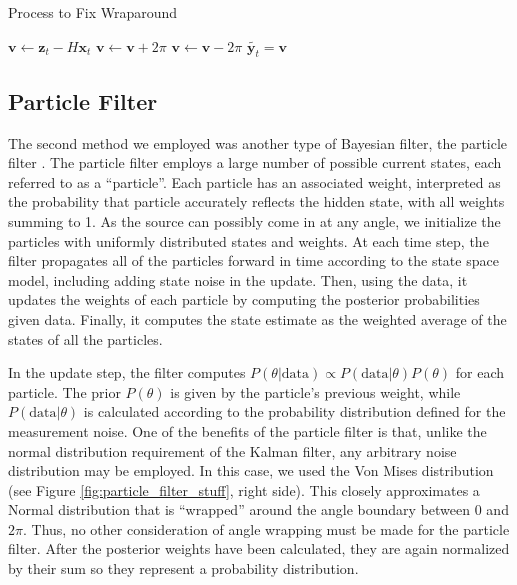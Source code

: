 \documentclass[11pt]{amsart}
\begin{document}
\begin{algorithm}
    \caption{Process to Fix Wraparound}\label{alg:kalman}    
    \begin{algorithmic}
        \State $\mathbf{v} \gets \mathbf{z}_t - H\mathbf{x}_t$
            \State $\mathbf{v} \gets \mathbf{v} + 2\pi$
            \State $\mathbf{v} \gets \mathbf{v} - 2\pi$
        \EndIf 
        \State $\tilde{\mathbf{y}_t} = \mathbf{v}$ 
        \end{algorithmic}
    \end{algorithm}


\subsection{Particle Filter}
The second method we employed was another type of Bayesian filter, the particle filter \cite{Particle}. The particle filter employs a large number of possible current states, each referred to 
as a “particle”. Each particle has an associated weight, interpreted as the probability that particle accurately reflects the hidden state, with all weights summing to 1. As the source can possibly 
come in at any angle, we initialize the particles with uniformly distributed states and weights. At each time step, the filter propagates all of the particles forward in time according to the state space 
model, including adding state noise in the update. Then, using the data, it updates the weights of each particle by computing the posterior probabilities given data. Finally, it computes the state estimate 
as the weighted average of the states of all the particles. 

In the update step, the filter computes $P(\theta|\text{data}) \propto P(\text{data}|\theta)P(\theta)$ for each particle. The prior $P(\theta)$ is given by the particle’s previous weight, while $P(\text{data}|\theta)$ is calculated 
according to the probability distribution defined for the measurement noise. One of the benefits of the particle filter is that, unlike the normal distribution requirement of the Kalman filter, any arbitrary noise 
distribution may be employed. In this case, we used the Von Mises distribution (see Figure \ref{fig:particle_filter_stuff}, right side). This closely approximates a Normal distribution 
that is “wrapped” around the angle boundary between $0$ and $2\pi$. Thus, no other consideration of angle wrapping must be made for the particle filter. After the posterior weights have been calculated, they are again normalized by 
their sum so they represent a probability distribution.
\end{document}

